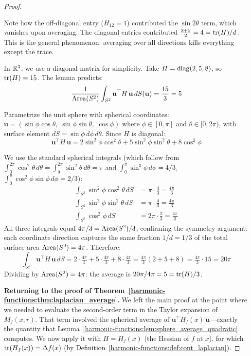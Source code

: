 \begin{notechapter}
\begin{proof}
\begin{examplebox}[title=Verifying the Lemma in 2D]
Note how the off-diagonal entry ($H_{12} = 1$) contributed the
$\sin 2\theta$ term, which vanishes upon averaging. The diagonal entries
contributed $\frac{3+5}{2} = 4 = \operatorname{tr}(H)/d$. This is the general
phenomenon: averaging over all directions kills everything except the trace.
\end{examplebox}

\begin{examplebox}[title=Verifying the Lemma in 3D]
In $\mathbb{R}^3$, we use a diagonal matrix for simplicity. Take
$H = \operatorname{diag}(2, 5, 8)$, so $\operatorname{tr}(H) = 15$. The lemma predicts:
\[
\frac{1}{\operatorname{Area}(S^2)}\int_{S^2}
  \mathbf{u}^\top H\,\mathbf{u}\,dS(\mathbf{u})
= \frac{15}{3} = 5
\]

Parametrize the unit sphere with spherical coordinates:
$\mathbf{u} = (\sin\phi\cos\theta,\;\sin\phi\sin\theta,\;\cos\phi)$
where $\phi \in [0,\pi]$ and $\theta \in [0,2\pi)$, with surface element
$dS = \sin\phi\,d\phi\,d\theta$. Since $H$ is diagonal:
\[
\mathbf{u}^\top H\,\mathbf{u}
= 2\sin^2\!\phi\cos^2\!\theta
+ 5\sin^2\!\phi\sin^2\!\theta
+ 8\cos^2\!\phi
\]

We use the standard spherical integrals (which follow from
$\int_0^{2\pi}\cos^2\!\theta\,d\theta
= \int_0^{2\pi}\sin^2\!\theta\,d\theta = \pi$ and
$\int_0^{\pi}\sin^3\!\phi\,d\phi = 4/3$,
$\int_0^{\pi}\cos^2\!\phi\sin\phi\,d\phi = 2/3$):
\begin{align}
\int_{S^2}\sin^2\!\phi\cos^2\!\theta\,dS
&= \pi \cdot \tfrac{4}{3} = \tfrac{4\pi}{3} \\
\int_{S^2}\sin^2\!\phi\sin^2\!\theta\,dS
&= \pi \cdot \tfrac{4}{3} = \tfrac{4\pi}{3} \\
\int_{S^2}\cos^2\!\phi\,dS
&= 2\pi \cdot \tfrac{2}{3} = \tfrac{4\pi}{3}
\end{align}
All three integrals equal $4\pi/3 = \operatorname{Area}(S^2)/3$, confirming the symmetry
argument: each coordinate direction captures the same fraction $1/d = 1/3$
of the total surface area $\operatorname{Area}(S^2) = 4\pi$. Therefore:
\[
\int_{S^2} \mathbf{u}^\top H\,\mathbf{u}\,dS
= 2 \cdot \tfrac{4\pi}{3} + 5 \cdot \tfrac{4\pi}{3}
  + 8 \cdot \tfrac{4\pi}{3}
= \tfrac{4\pi}{3}(2 + 5 + 8)
= \tfrac{4\pi}{3}\cdot 15 = 20\pi
\]
Dividing by $\operatorname{Area}(S^2) = 4\pi$: the average is $20\pi / 4\pi = 5 =
\operatorname{tr}(H)/3$. \checkmark
\end{examplebox}

\medskip
\noindent\textbf{Returning to the proof of
Theorem~\ref{harmonic-functions:thm:laplacian_average}.} We left the main proof at the point
where we needed to evaluate the second-order term in the Taylor expansion of
$M_f(x,r)$. That term involved the spherical average of
$\mathbf{u}^\top H_f(x)\,\mathbf{u}$---exactly the quantity that
Lemma~\ref{harmonic-functions:lem:sphere_average_quadratic} computes. We now apply it with
$H = H_f(x)$ (the Hessian of $f$ at $x$), for which
$\operatorname{tr}(H_f(x)) = \Delta f(x)$ (by Definition~\ref{harmonic-functions:def:cont_laplacian}).


\end{proof}
\end{notechapter}
